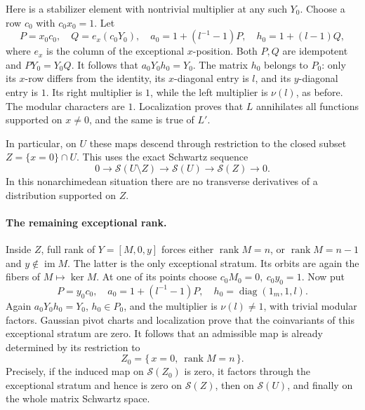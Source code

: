 Here is a stabilizer element with nontrivial multiplier at
any such \(Y_0\).  Choose a row \(c_0\) with \(c_0x_0=1\).
Let
\[
 P=x_0c_0,\quad
 Q=e_x(c_0Y_0),\quad
 a_0=1+(l^{-1}-1)P,\quad h_0=1+(l-1)Q,
\]
where \(e_x\) is the column of the exceptional \(x\)-position.
Both \(P,Q\) are idempotent and \(PY_0=Y_0Q\).
It follows that \(a_0Y_0h_0=Y_0\).
The matrix \(h_0\) belongs to \(P_0\): only its \(x\)-row
differs from the identity, its \(x\)-diagonal entry is \(l\),
and its \(y\)-diagonal entry is \(1\).
Its right multiplier is \(1\), while the left multiplier is
\(\nu(l)\), as before.  The modular characters are \(1\).
Localization proves that \(L\) annihilates all functions
supported on \(x\ne0\), and the same is true of \(L'\).

In particular, on \(U\) these maps descend through restriction
to the closed subset \(Z=\{x=0\}\cap U\).  This uses the exact
Schwartz sequence
\[
 0\longrightarrow\mathcal S(U\setminus Z)
 \longrightarrow\mathcal S(U)\longrightarrow\mathcal S(Z)
 \longrightarrow0 .
\]
In this nonarchimedean situation there are no transverse
derivatives of a distribution supported on \(Z\).

\paragraph{The remaining exceptional rank.}
Inside \(Z\), full rank of \(Y=[M,0,y]\) forces either
\(\operatorname{rank}M=n\), or
\(\operatorname{rank}M=n-1\) and \(y\notin\operatorname{im}M\).
The latter is the only exceptional stratum.
Its orbits are again the fibers of \(M\mapsto\ker M\).
At one of its points choose \(c_0M_0=0,\ c_0y_0=1\).
Now put
\[
       P=y_0c_0,\quad
       a_0=1+(l^{-1}-1)P,\quad
       h_0=\operatorname{diag}(1_m,1,l).
\]
Again \(a_0Y_0h_0=Y_0\), \(h_0\in P_0\), and the multiplier
is \(\nu(l)\ne1\), with trivial modular factors.
Gaussian pivot charts and localization prove that the
coinvariants of this exceptional stratum are zero.
It follows that an admissible map is already determined by
its restriction to
\[
                 Z_0=\{\,x=0,\ \operatorname{rank}M=n\,\}.
\]
Precisely, if the induced map on \(\mathcal S(Z_0)\) is zero,
it factors through the exceptional stratum and hence is zero
on \(\mathcal S(Z)\), then on \(\mathcal S(U)\), and finally
on the whole matrix Schwartz space.

